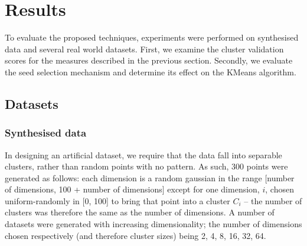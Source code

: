 \section{Results}
To evaluate the proposed techniques, experiments were performed on synthesised data and several real world datasets.  First, we examine the cluster validation scores for the measures described in the previous section.  Secondly, we evaluate the seed selection mechanism and determine its effect on the KMeans algorithm.
\subsection{Datasets}
\subsubsection{Synthesised data}
In designing an artificial dataset, we require that the data fall into separable clusters, rather than random points with no pattern.  As such, 300 points were generated as follows: each dimension is a random gaussian in the range [number of dimensions, 100 + number of dimensions]  except for one dimension, $i$, chosen uniform-randomly in [0, 100] to bring that point into a cluster $C_i$ -- the number of clusters was therefore the same as the number of dimensions.  A number of datasets were generated with increasing dimensionality; the number of dimensions chosen respectively (and therefore cluster sizes) being 2, 4, 8, 16, 32, 64.

